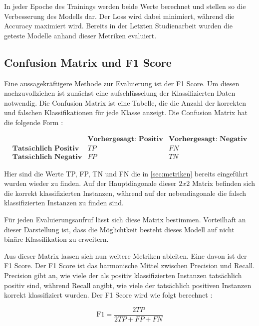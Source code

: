 In jeder Epoche des Trainings werden beide Werte berechnet und stellen so die Verbesserung des Modells dar. Der Loss wird dabei minimiert, während die Accuracy maximiert wird. Bereits in der Letzten Studienarbeit wurden die geteste Modelle anhand dieser Metriken evaluiert.

\subsection{Confusion Matrix und F1 Score} \label{sec:confusionmatrix}

Eine aussagekräftigere Methode zur Evaluierung ist der F1 Score. Um diesen nachzuvollziehen ist zunächst eine aufschlüsselung der Klassifizierten Daten notwendig. Die Confusion Matrix ist eine Tabelle, die die Anzahl der korrekten und falschen Klassifikationen für jede Klasse anzeigt. Die Confusion Matrix hat die folgende Form \cite{lipton_thresholding_2014}:

\[
\begin{array}{c|cc}
    & \textbf{Vorhergesagt: Positiv} & \textbf{Vorhergesagt: Negativ} \\
    \hline
    \textbf{Tatsächlich Positiv} & TP & FN \\
    \textbf{Tatsächlich Negativ} & FP & TN
\end{array}
\]

Hier sind die Werte TP, FP, TN und FN die in \autoref{sec:metriken} bereits eingeführt wurden wieder zu finden. Auf der Hauptdiagonale dieser $2x2$ Matrix befinden sich die korrekt klassifizierten Instanzen, während auf der nebendiagonale die falsch klassifizierten Instanzen zu finden sind. 

Für jeden Evaluierungsaufruf lässt sich diese Matrix bestimmen. Vorteilhaft an dieser Darstellung ist, dass die Möglichtkeit besteht dieses Modell auf nicht binäre Klassifikation zu erweitern. 

Aus dieser Matrix lassen sich nun weitere Metriken ableiten. Eine davon ist der F1 Score. Der F1 Score ist das harmonische Mittel zwischen Precision und Recall. Precision gibt an, wie viele der als positiv klassifizierten Instanzen tatsächlich positiv sind, während Recall angibt, wie viele der tatsächlich positiven Instanzen korrekt klassifiziert wurden. Der F1 Score wird wie folgt berechnet \cite{lipton_thresholding_2014}:

\begin{equation}
    \text{F1} = \frac{2 TP}{2 TP + FP + FN }
\end{equation}

